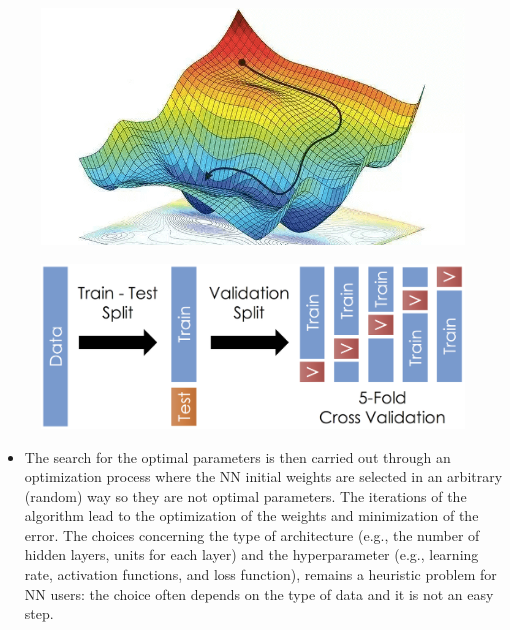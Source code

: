 \documentclass[12pt]{beamer}
\begin{document}
\begin{frame}
	\scriptsize
		
	\begin{figure}
		\centering
		\includegraphics[width=.9\linewidth]{gradient}		
	\end{figure}
\end{frame}
	\begin{frame}
		\scriptsize
	\begin{figure}
		\centering
		\includegraphics[width=.8\linewidth]{traintest}		
	\end{figure}
	
	
	\begin{itemize}

	\item The search for the optimal parameters is then carried out through an optimization process where the NN initial weights are selected in an arbitrary (random) way so they are not optimal parameters. The iterations of the algorithm lead to the optimization of the weights and minimization of the error. 
	The choices concerning the type of architecture (e.g., the number of hidden layers, units for each layer) and the hyperparameter (e.g., learning rate, activation functions, and loss function), remains a heuristic problem for NN users: the choice often depends on the type of data and it is not an easy step. 

	\end{itemize}
\end{frame}
\end{document}
